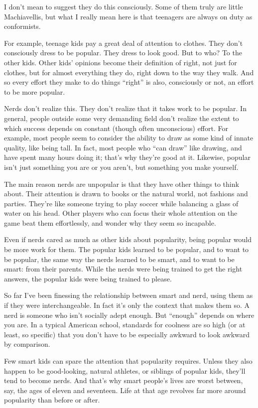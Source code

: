 I don't mean to suggest they do this consciously. Some of them truly are
little Machiavellis, but what I really mean here is that teenagers are
always on duty as conformists.

For example, teenage kids pay a great deal of attention to clothes. They
don't consciously dress to be popular. They dress to look good. But to
who? To the other kids. Other kids' opinions become their definition of
right, not just for clothes, but for almost everything they do, right
down to the way they walk. And so every effort they make to do things
``right'' is also, consciously or not, an effort to be more popular.

Nerds don't realize this. They don't realize that it takes work to be
popular. In general, people outside some very demanding field don't
realize the extent to which success depends on constant (though often
unconscious) effort. For example, most people seem to consider the
ability to draw as some kind of innate quality, like being tall. In
fact, most people who ``can draw'' like drawing, and have spent many
hours doing it; that's why they're good at it. Likewise, popular isn't
just something you are or you aren't, but something you make yourself.

The main reason nerds are unpopular is that they have other things to
think about. Their attention is drawn to books or the natural world, not
fashions and parties. They're like someone trying to play soccer while
balancing a glass of water on his head. Other players who can focus
their whole attention on the game beat them effortlessly, and wonder why
they seem so incapable.

Even if nerds cared as much as other kids about popularity, being
popular would be more work for them. The popular kids learned to be
popular, and to want to be popular, the same way the nerds learned to be
smart, and to want to be smart: from their parents. While the nerds were
being trained to get the right answers, the popular kids were being
trained to please.

So far I've been finessing the relationship between smart and nerd,
using them as if they were interchangeable. In fact it's only the
context that makes them so. A nerd is someone who isn't socially adept
enough. But ``enough'' depends on where you are. In a typical American
school, standards for coolness are so high (or at least, so specific)
that you don't have to be especially awkward to look awkward by
comparison.

Few smart kids can spare the attention that popularity requires. Unless
they also happen to be good-looking, natural athletes, or siblings of
popular kids, they'll tend to become nerds. And that's why smart
people's lives are worst between, say, the ages of eleven and seventeen.
Life at that age revolves far more around popularity than before or
after.

